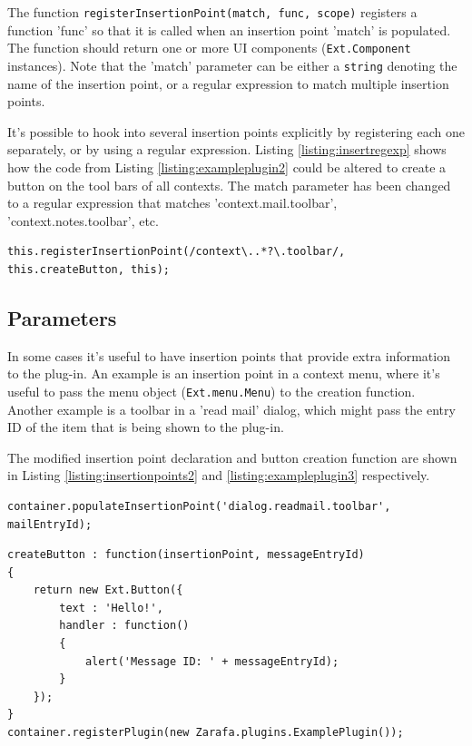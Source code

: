 The function {\tt registerInsertionPoint(match, func, scope)} registers a function 'func' so that it is 
called when an insertion point 'match' is populated. The function should return one or more UI components
({\tt Ext.Component} instances). Note that the 'match' parameter can be either a {\tt string} denoting
the name of the insertion point, or a regular expression to match multiple insertion points.

It's possible to hook into several insertion points explicitly by registering each one separately,
or by using a regular expression. Listing \ref{listing:insertregexp} shows how the code from
Listing \ref{listing:exampleplugin2} could be altered to create a button on the tool bars
of all contexts. The match parameter has been changed to a regular expression that matches 
'context.mail.toolbar', 'context.notes.toolbar', etc.

\begin{lstlisting}[caption={Matching with regular expressions.}, label=listing:insertregexp]
this.registerInsertionPoint(/context\..*?\.toolbar/, this.createButton, this);\end{lstlisting}
 
\subsection{Parameters}

In some cases it's useful to have insertion points that provide extra information to the plug-in. An example 
is an insertion point in a context menu, where it's useful to pass the menu object ({\tt Ext.menu.Menu}) to the
creation function. Another example is a toolbar in a 'read mail' dialog, which might pass the entry ID of the 
item that is being shown to the plug-in. 

The modified insertion point declaration and button creation function are shown in Listing 
\ref{listing:insertionpoints2} and \ref{listing:exampleplugin3} respectively.

\begin{lstlisting}[caption={Insertion point with parameter.}, label=listing:insertionpoints2]
container.populateInsertionPoint('dialog.readmail.toolbar', mailEntryId);
\end{lstlisting}

\begin{lstlisting}[caption={Using an insertion point with parameters.}, label=listing:exampleplugin3]
createButton : function(insertionPoint, messageEntryId)
{
	return new Ext.Button({
		text : 'Hello!',
		handler : function()
		{
			alert('Message ID: ' + messageEntryId);
		}
	});
}	
container.registerPlugin(new Zarafa.plugins.ExamplePlugin());\end{lstlisting}






